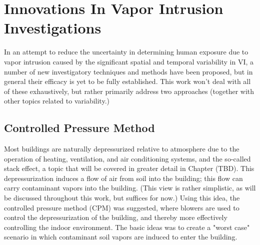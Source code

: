 \begin{comment}
Present some ideas that have been put forward to dealing with VI variability.

Cover:
- CPM
- Other techniques?
- Use of ITSs to sample during periods of elevated VI potential

The key point to make that these approaches have something in common: that they either seek to manipulate or utilize some external variable for a desired result.

CPM obviously seeks to artificially manipulate the building pressurization to control contaminant entry rate.
ITS can be variables other than pressure, but it is a key one, and these are used to plan investigations so that higher contaminant concentrations are more likely to be found.

Again, give a few examples from literature and describe what went on.

\end{comment}

\section{Innovations In Vapor Intrusion Investigations}

In an attempt to reduce the uncertainty in determining human exposure due to vapor intrusion caused by the significant spatial and temporal variability in VI, a number of new investigatory techniques and methods have been proposed, but in general their efficacy is yet to be fully established\cite{mchugh_recent_2017}.
This work won't deal with all of these exhaustively, but rather primarily address two approaches (together with other topics related to variability.)\par

\subsection{Controlled Pressure Method}

Most buildings are naturally depressurized relative to atmosphere due to the operation of heating, ventilation, and air conditioning systems, and the so-called stack effect, a topic that will be covered in greater detail in Chapter (TBD). %
This depressurization induces a flow of air from soil into the building; this flow can carry contaminant vapors into the building.
(This view is rather simplistic, as will be discussed throughout this work, but suffices for now.)
Using this idea, the controlled pressure method (CPM) was suggested, where blowers are used to control the depressurization of the building, and thereby more effectively controlling the indoor environment.
The basic ideas was to create a "worst case" scenario in which contaminant soil vapors are induced to enter the building.\par

